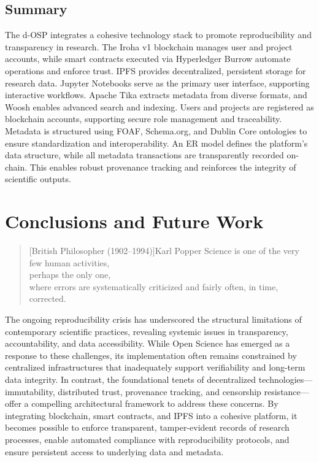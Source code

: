 \documentclass[final]{rc-book-2.14}
\begin{document}
\section{Summary}
\label{chp:proposed_model:sec:summary}

The d-OSP integrates a cohesive technology stack to promote reproducibility and transparency in research. The Iroha v1 blockchain manages user and project accounts, while smart contracts executed via Hyperledger Burrow automate operations and enforce trust. IPFS provides decentralized, persistent storage for research data. Jupyter Notebooks serve as the primary user interface, supporting interactive workflows. Apache Tika extracts metadata from diverse formats, and Woosh enables advanced search and indexing. Users and projects are registered as blockchain accounts, supporting secure role management and traceability. Metadata is structured using FOAF, Schema.org, and Dublin Core ontologies to ensure standardization and interoperability. An ER model defines the platform’s data structure, while all metadata transactions are transparently recorded on-chain. This enables robust provenance tracking and reinforces the integrity of scientific outputs.

\chapter{Conclusions and Future Work}
\label{chp:conclusions}

\begin{quotation}[British Philosopher (1902–1994)]{Karl Popper}
    Science is one of the very few human activities, \\
    perhaps the only one, \\
    where errors are systematically criticized and fairly often, in time, corrected.
\end{quotation}

\drop The ongoing reproducibility crisis has underscored the structural limitations of contemporary scientific practices, revealing systemic issues in transparency, accountability, and data accessibility. While Open Science has emerged as a response to these challenges, its implementation often remains constrained by centralized infrastructures that inadequately support verifiability and long-term data integrity. In contrast, the foundational tenets of decentralized technologies—immutability, distributed trust, provenance tracking, and censorship resistance—offer a compelling architectural framework to address these concerns. By integrating blockchain, smart contracts, and IPFS into a cohesive platform, it becomes possible to enforce transparent, tamper-evident records of research processes, enable automated compliance with reproducibility protocols, and ensure persistent access to underlying data and metadata.
\end{document}
